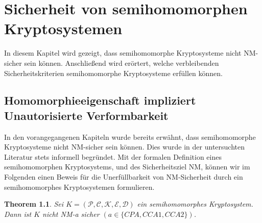 \chapter[Sicherheit von semihomomorphen Kryptosystemen]{\texorpdfstring{Sicherheit von semihomomorphen \\Kryptosystemen}{Sicherheit von semihomomorphen Kryptosystemen}}
\label{SVHK}

In diesem Kapitel wird gezeigt, dass semihomomorphe Kryptosysteme nicht NM-sicher sein können. Anschließend wird erörtert, welche verbleibenden Sicherheitskriterien semihomomorphe Kryptosysteme erfüllen können.

\section{Homomorphieeigenschaft impliziert Unautorisierte Verformbarkeit}

In den vorangegangenen Kapiteln wurde bereits erwähnt, dass semihomomorphe Kryptosysteme nicht NM-sicher sein können. Dies wurde in der untersuchten Literatur stets informell begründet. Mit der formalen Definition eines semihomomorphen Kryptosystems, und des Sicherheitsziel NM, können wir im Folgenden einen Beweis für die Unerfüllbarkeit von NM-Sicherheit durch ein semihomomorphes Kryptosystemen formulieren.

\newtheorem{theorem2}{Theorem}
\theoremstyle{plain}
\begin{theorem2}
	\label{SMnichtNMsicher}
	Sei $K = (\mathcal{P},\mathcal{C},\mathcal{K},\mathcal{E},\mathcal{D})$ ein semihomomorphes Kryptosystem. Dann ist $K$ nicht NM-a sicher $(a\in\{CPA,CCA1,CCA2\})$.
\end{theorem2}

